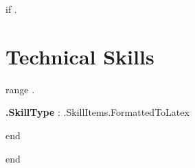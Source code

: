 {{if .}}
\section{Technical Skills}
\begin{itemize}[leftmargin=0.15in, label={}]
    {{range .}}
   \small{\item{
    \textbf{ {{.SkillType}} }{: {{.SkillItems.FormattedToLatex}}} \\
   }}
   {{end}}
\end{itemize}
\vspace{-15pt}
{{end}}